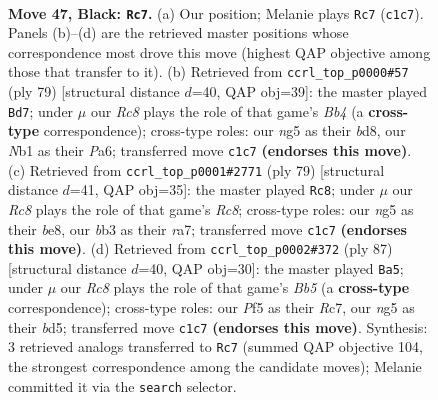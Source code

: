 \documentclass[11pt]{article}
\begin{document}
\clearpage

\begin{figure}[p]\centering
\begin{subfigure}{0.46\textwidth}\centering
\resizebox{\linewidth}{!}{%
\newchessgame
\chessboard[
  setfen={6k1/5p1p/b5p1/4PpN1/5P2/1B6/P4KPP/1nr5 b - - 3 47},
  showmover=false,
  pgfstyle=straightmove, color=movearrow, markmove={c1-c7}
]}
\caption{}
\end{subfigure}\hfill
\begin{subfigure}{0.46\textwidth}\centering
\resizebox{\linewidth}{!}{%
\newchessgame
\chessboard[
  setfen={3B2k1/6p1/p3Np2/Pb3n1p/1p6/8/1PP2KPP/8 b - - 4 40},
  showmover=false,
  pgfstyle=straightmove, color=movearrow, markmove={b5-d7}
]}
\caption{}
\end{subfigure}
\\[4pt]
\begin{subfigure}{0.46\textwidth}\centering
\resizebox{\linewidth}{!}{%
\newchessgame
\chessboard[
  setfen={4B3/R4pk1/1p2p1p1/7p/7P/4P3/1n3PPK/2r5 b - - 5 40},
  showmover=false,
  pgfstyle=straightmove, color=movearrow, markmove={c1-c8}
]}
\caption{}
\end{subfigure}\hfill
\begin{subfigure}{0.46\textwidth}\centering
\resizebox{\linewidth}{!}{%
\newchessgame
\chessboard[
  setfen={8/2r2pk1/5pp1/3B4/1b6/3N2Pp/5P1P/B4K2 b - - 4 44},
  showmover=false,
  pgfstyle=straightmove, color=movearrow, markmove={b4-a5}
]}
\caption{}
\end{subfigure}
\caption{\textbf{Move 47, Black: \texttt{Rc7}.} (a) Our position; Melanie plays \texttt{Rc7} (\texttt{c1c7}). Panels (b)--(d) are the retrieved master positions whose correspondence most drove this move (highest QAP objective among those that transfer to it). (b) Retrieved from \texttt{ccrl\_top\_p0000\#57} (ply 79) [structural distance $d$=40, QAP obj=39]: the master played \texttt{Bd7}; under $\mu$ our \emph{Rc8} plays the role of that game's \emph{Bb4} (a \textbf{cross-type} correspondence); cross-type roles: our \emph{n}g5 as their \emph{b}d8, our \emph{N}b1 as their \emph{P}a6; transferred move \texttt{c1c7} \textbf{(endorses this move)}. (c) Retrieved from \texttt{ccrl\_top\_p0001\#2771} (ply 79) [structural distance $d$=41, QAP obj=35]: the master played \texttt{Rc8}; under $\mu$ our \emph{Rc8} plays the role of that game's \emph{Rc8}; cross-type roles: our \emph{n}g5 as their \emph{b}e8, our \emph{b}b3 as their \emph{r}a7; transferred move \texttt{c1c7} \textbf{(endorses this move)}. (d) Retrieved from \texttt{ccrl\_top\_p0002\#372} (ply 87) [structural distance $d$=40, QAP obj=30]: the master played \texttt{Ba5}; under $\mu$ our \emph{Rc8} plays the role of that game's \emph{Bb5} (a \textbf{cross-type} correspondence); cross-type roles: our \emph{P}f5 as their \emph{R}c7, our \emph{n}g5 as their \emph{b}d5; transferred move \texttt{c1c7} \textbf{(endorses this move)}. Synthesis: 3 retrieved analogs transferred to \texttt{Rc7} (summed QAP objective 104, the strongest correspondence among the candidate moves); Melanie committed it via the \texttt{search} selector.}
\label{fig:thought-m93}
\end{figure}
\end{document}
